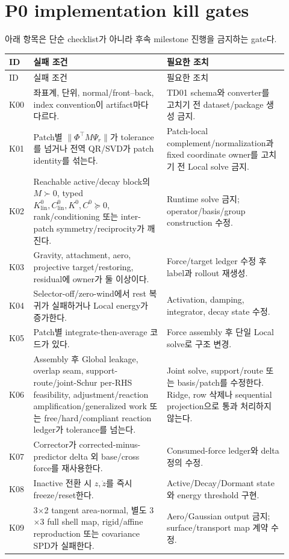 \documentclass[10pt,a4paper]{article}
\begin{document}
\section{P0 implementation kill gates}

아래 항목은 단순 checklist가 아니라 후속 milestone 진행을 금지하는 gate다.

\begin{longtable}{L{0.06\linewidth}L{0.45\linewidth}L{0.41\linewidth}}
\toprule
ID & 실패 조건 & 필요한 조치 \\
\midrule
\endfirsthead
\toprule
ID & 실패 조건 & 필요한 조치 \\
\midrule
\endhead
K00 & 좌표계, 단위, normal/front--back, index convention이 artifact마다 다르다. & TD01 schema와 converter를 고치기 전 dataset/package 생성 금지. \\
K01 & Patch별 \(\|\Phi^\top M\Psi_r\|\)가 tolerance를 넘거나 전역 QR/SVD가 patch identity를 섞는다. & Patch-local complement/normalization과 fixed coordinate owner를 고치기 전 Local solve 금지. \\
K02 & Reachable active/decay block의 \(M\succ0\), typed \(K_{\mathrm{lin}}^0,C_{\mathrm{lin}}^0,K^0,C^0\succeq0\), rank/conditioning 또는 inter-patch symmetry/reciprocity가 깨진다. & Runtime solve 금지; operator/basis/group construction 수정. \\
K03 & Gravity, attachment, aero, projective target/restoring, residual에 owner가 둘 이상이다. & Force/target ledger 수정 후 label과 rollout 재생성. \\
K04 & Selector-off/zero-wind에서 rest 복귀가 실패하거나 Local energy가 증가한다. & Activation, damping, integrator, decay state 수정. \\
K05 & Patch별 integrate-then-average 코드가 있다. & Force assembly 후 단일 Local solve로 구조 변경. \\
K06 & Assembly 후 Global leakage, overlap seam, support-route/joint-Schur per-RHS feasibility,
adjustment/reaction amplification/generalized work 또는 free/hard/compliant reaction ledger가 tolerance를 넘는다. & Joint solve, support/route 또는 basis/patch를 수정한다. Ridge, row 삭제나 sequential projection으로 통과 처리하지 않는다. \\
K07 & Corrector가 corrected-minus-predictor delta 외 base/cross force를 재사용한다. & Consumed-force ledger와 delta 정의 수정. \\
K08 & Inactive 전환 시 \(z,\dot z\)를 즉시 freeze/reset한다. & Active/Decay/Dormant state와 energy threshold 구현. \\
K09 & 3\(\times\)2 tangent area-normal, 별도 3\(\times\)3 full shell map, rigid/affine reproduction 또는 covariance SPD가 실패한다. & Aero/Gaussian output 금지; surface/transport map 계약 수정. \\

\end{longtable}
\end{document}

